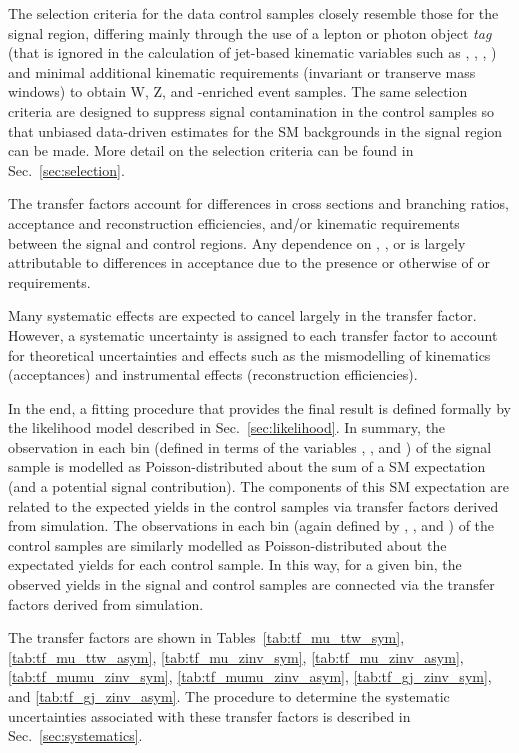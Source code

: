 The selection criteria for the data control samples closely resemble
those for the signal region, differing mainly through the use of a
lepton or photon object {\it tag} (that is ignored in the calculation
of jet-based kinematic variables such as \scalht, \mht, \alphat, \etc)
and minimal additional kinematic requirements (\eg invariant or
transerve mass windows) to obtain W, Z, and \ttbar-enriched event
samples. The same selection criteria are designed to suppress signal
contamination in the control samples so that unbiased data-driven
estimates for the SM backgrounds in the signal region can be
made. More detail on the selection criteria can be found in Sec.~\ref{sec:selection}.

The transfer factors account for differences in cross sections and
branching ratios, acceptance and reconstruction efficiencies, and/or
kinematic requirements between the signal and control regions. Any
dependence on \njet, \nb, or \HT is largely attributable to
differences in acceptance due to the presence or otherwise of \alphat
or \mht requirements.

Many systematic effects are expected to cancel largely in the transfer
factor. However, a systematic uncertainty is assigned to each transfer
factor to account for theoretical uncertainties and effects such as
the mismodelling of kinematics (\eg acceptances) and instrumental
effects (\eg reconstruction efficiencies).

In the end, a fitting procedure that provides the final result is
defined formally by the likelihood model described in
Sec.~\ref{sec:likelihood}. In summary, the observation in each bin
(defined in terms of the variables \njet, \nb, and \scalht) of the
signal sample is modelled as Poisson-distributed about the sum of a SM
expectation (and a potential signal contribution). The components of
this SM expectation are related to the expected yields in the control
samples via transfer factors derived from simulation. The observations
in each bin (again defined by \njet, \nb, and \scalht) of the control
samples are similarly modelled as Poisson-distributed about the
expectated yields for each control sample. In this way, for a given
bin, the observed yields in the signal and control samples are
connected via the transfer factors derived from simulation. 

The transfer factors are shown in Tables~\ref{tab:tf_mu_ttw_sym},
\ref{tab:tf_mu_ttw_asym}, \ref{tab:tf_mu_zinv_sym},
\ref{tab:tf_mu_zinv_asym}, \ref{tab:tf_mumu_zinv_sym},
\ref{tab:tf_mumu_zinv_asym}, \ref{tab:tf_gj_zinv_sym}, and
\ref{tab:tf_gj_zinv_asym}. The procedure to determine the systematic
uncertainties associated with these transfer factors is described in
Sec.~\ref{sec:systematics}.


